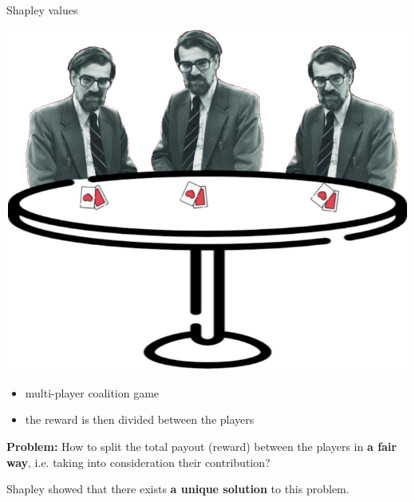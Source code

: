 
\begin{frame}{Shapley values}
    \begin{center}
    \begin{minipage}{0.4\textwidth}
    \begin{center}
 	   \includegraphics[width=0.9\linewidth]{fig/shapley-game.png}
    \end{center}
    \end{minipage}
    \begin{minipage}{0.55\textwidth}
    \begin{itemize}
        \item multi-player coalition game 
        \item the reward is then divided between the players
    \end{itemize}
    \end{minipage}    
    \end{center}
    
    \textbf{Problem:} How to split the total payout (reward) between the players in \textbf{a fair way}, i.e. taking into consideration their contribution?

    \vspace{0.05in}  %
    Shapley showed that there exists \textbf{a unique solution} to this problem.
    

\end{frame}
